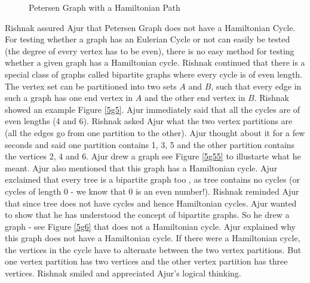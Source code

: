 \begin{figure}
\begin{center}
\caption{ Petersen Graph with a Hamiltonian Path}\label{5g4}
\end{center}
\end{figure}
Rishnak assured Ajur that Petersen Graph does not have a Hamiltonian Cycle. For testing whether a graph has an Eulerian Cycle or not can easily be tested (the degree of every vertex has to be even), there is no easy method for testing whether a given graph has a Hamiltonian cycle. 
Rishnak continued that there is a special class of graphs called bipartite graphs where every cycle is of even length. The vertex set can be partitioned into two sets $A$ and $B$, such that every edge in such a graph has one end vertex in $A$ and the other end vertex in $B$. Rishnak showed an example Figure \ref{5g5}. Ajur immediately said that all the cycles are of even lengths (4 and 6). Rishnak asked Ajur what the two vertex partitions are (all the edges go from one partition to the other). Ajur thought about it for a few seconds and said one partition contains 1, 3, 5 and the other partition contains the vertices 2, 4 and 6. Ajur drew a graph see Figure \ref{5g55} to illustarte what he meant. Ajur also mentioned that this graph has a Hamiltonian cycle. Ajur exclaimed that every tree is a bipartite graph too , as tree contains no cycles (or cycles of length 0 - we know that 0 is an even number!). Rishnak reminded Ajur that since tree does not have cycles and hence Hamiltonian cycles. 
Ajur wanted to show that he has understood the concept of bipartite graphs. So he drew a graph - see Figure \ref{5g6} that does not a Hamiltonian cycle. Ajur explained why this graph does not have a Hamiltonian cycle. If there were a Hamiltonian cycle, the vertices in the cycle have to alternate between the two vertex partitions. But one vertex partition has two vertices and the other vertex partition has three vertices. Rishnak smiled and appreciated Ajur's logical thinking.

